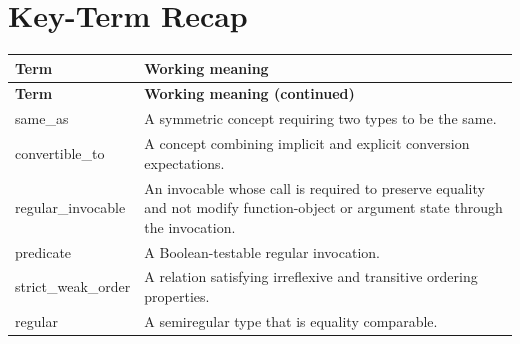 \documentclass[11pt,letterpaper]{article}
\begin{document}
\section{Key-Term Recap}
\begin{longtable}{@{}>{\RaggedRight\arraybackslash}p{}>{\RaggedRight\arraybackslash}p{}@{}}\toprule\textbf{Term} & \textbf{Working meaning}\\\midrule\endfirsthead\toprule\textbf{Term} & \textbf{Working meaning (continued)}\\\midrule\endhead\bottomrule\endfoot
same\_\allowbreak{}as & A symmetric concept requiring two types to be the same.\\
convertible\_\allowbreak{}to & A concept combining implicit and explicit conversion expectations.\\
regular\_\allowbreak{}invocable & An invocable whose call is required to preserve equality and not modify function-object or argument state through the invocation.\\
predicate & A Boolean-testable regular invocation.\\
strict\_\allowbreak{}weak\_\allowbreak{}order & A relation satisfying irreflexive and transitive ordering properties.\\
regular & A semiregular type that is equality comparable.\\
\end{longtable}
\end{document}

